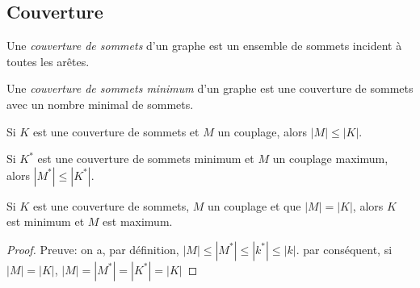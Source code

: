 \subsection{Couverture}
\begin{mydef}
  Une \emph{couverture de sommets} d’un graphe est un ensemble de sommets incident à toutes les arêtes.
\end{mydef}

\begin{mydef}
  Une \emph{couverture de sommets minimum} d’un graphe est une couverture de sommets avec un nombre minimal de sommets.
\end{mydef}

\begin{myrem}
  Si $K$ est une couverture de sommets et $M$ un couplage, alors $|M| \leq |K|$.
\end{myrem}

\begin{myrem}
  Si $K^*$ est une couverture de sommets minimum et $M$ un couplage maximum, alors $|M^*| \leq |K^*|$.
\end{myrem}

\begin{mylem}
  Si $K$ est une couverture de sommets, $M$ un couplage et que $|M| = |K|$, alors $K$ est minimum et $M$ est maximum.
  \begin{proof}
     Preuve: on a, par définition, $|M| \leq |M^*| \leq |k^*| \leq |k|$. par conséquent, si $|M| = |K|$, $|M| = |M^*| = |K^*| = |K|$
  \end{proof}
\end{mylem}

